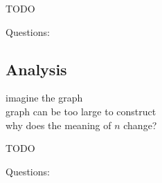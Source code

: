 \documentclass[a4]{scrartcl}
\begin{document}
\color{red} TODO
\color{black}

\color{violet} Questions:
\color{black}



\subsection*{Analysis}
imagine the graph \\
graph can be too large to construct \\
why does the meaning of $n$ change?



\color{red} TODO
\color{black}

\color{violet} Questions:
\color{black}















\newpage

\printbibliography
\end{document}
